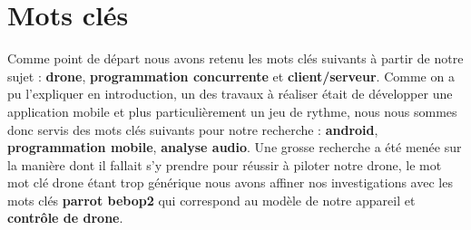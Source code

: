 \section{Mots clés}
Comme point de départ nous avons retenu les mots clés suivants à partir de notre sujet : \textbf{drone}, \textbf{programmation concurrente} et \textbf{client/serveur}. Comme on a pu l'expliquer en introduction, un des travaux à réaliser était de développer une application mobile et plus particulièrement un jeu de rythme, nous nous sommes donc servis des mots clés suivants pour notre recherche : \textbf{android}, \textbf{programmation mobile}, \textbf{analyse audio}. Une grosse recherche a été menée sur la manière dont il fallait s'y prendre pour réussir à piloter notre drone, le mot mot clé drone étant trop générique nous avons affiner nos investigations avec les mots clés \textbf{parrot bebop2} qui correspond au modèle de notre appareil et \textbf{contrôle de drone}.